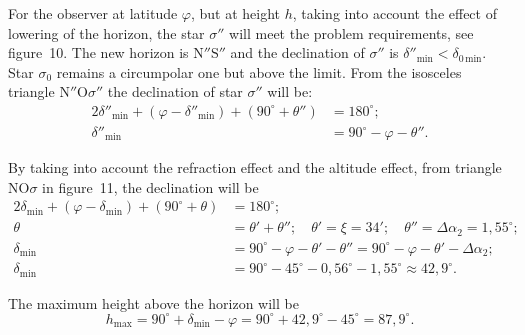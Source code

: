 \begin{description}
  For the observer at latitude $\varphi$, but at height $h$, taking into
  account the effect of lowering of the horizon, the star $\sigma''$ will
  meet the problem requirements, see figure~10. The new horizon is
  $\mathrm{N}''\mathrm{S}''$ and the declination of $\sigma''$ is
  $\delta''_{\mathrm{min}} < \delta_{0\,\mathrm{min}}$. Star $\sigma_0$
  remains a circumpolar one but above the limit. From the isosceles triangle
  $\mathrm{N}''\mathrm{O}\sigma''$ the declination of star $\sigma''$ will
  be:
  \begin{align*}
  2\delta''_{\mathrm{min}} + (\varphi - \delta''_{\mathrm{min}})
    + (90^\circ + \theta'') &= 180^\circ;\\
  \delta''_{\mathrm{min}} &= 90^\circ - \varphi - \theta''.
  \end{align*}

  By taking into account the refraction effect and the altitude effect, from
  triangle $\mathrm{N}\mathrm{O}\sigma$ in figure~11, the declination will
  be
  \begin{align*}
  2\delta_{\mathrm{min}} + (\varphi - \delta_{\mathrm{min}})
    + (90^\circ + \theta) &= 180^\circ;\\
  \theta &= \theta' + \theta'';\quad
    \theta' = \xi = 34';\quad
    \theta'' = \Delta\alpha_2 = 1{,}55^\circ;\\
  \delta_{\mathrm{min}} &= 90^\circ - \varphi - \theta' - \theta''
    = 90^\circ - \varphi - \theta' - \Delta\alpha_2;\\
  \delta_{\mathrm{min}} &= 90^\circ - 45^\circ - 0{,}56^\circ
    - 1{,}55^\circ \approx 42{,}9^\circ.
  \end{align*}

\item[C.2)] The maximum height above the horizon will be
  \[ h_{\mathrm{max}} = 90^\circ + \delta_{\mathrm{min}} - \varphi
     = 90^\circ + 42{,}9^\circ - 45^\circ = 87{,}9^\circ. \]
\end{description}
